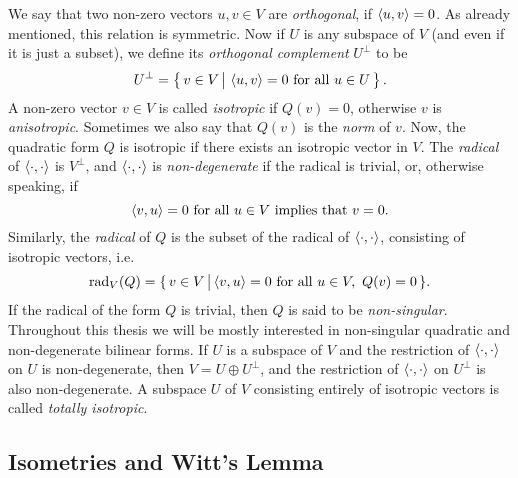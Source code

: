 We say that two non-zero vectors $u,v \in V$ are \textit{orthogonal}, if $\langle u, v \rangle = 0$. As
already mentioned, this relation is symmetric. Now if $U$ is any subspace of $V$ (and even if 
it is just a subset), we define its \textit{orthogonal complement} $U^{\perp}$ to be
\begin{equation}
	U^{\perp} = \left\{\, v \in V\, \big|\ \langle u, v \rangle = 0\ \mbox{for all}\  u \in U\,\right\}.
\end{equation}
A non-zero vector $v\in V$ is called \textit{isotropic} if $Q(v) = 0$, otherwise
$v$ is \textit{anisotropic}. Sometimes we also say that $Q(v)$ is the \textit{norm} of
$v$. Now, the quadratic form $Q$ is isotropic if there exists an isotropic vector in $V$. 
The \textit{radical} of $\langle \cdot, \cdot \rangle$ is $V^{\perp}$, and $\langle \cdot, \cdot \rangle$ is 
\textit{non-degenerate} if the radical is trivial, or, otherwise speaking, if
\begin{equation}
	\langle v, u \rangle = 0\ \mbox{for all}\ u \in V \mbox{ implies that } v = 0.
\end{equation}
Similarly, the \textit{radical} of $Q$ is 
the subset of the radical of $\langle \cdot, \cdot \rangle$, consisting of isotropic vectors, i.e.
\begin{equation}
	\label{eq:quadratic_form_radical}
	\mathrm{rad}_V(Q) = \{\, v \in V\, \big|\, \inner{v}{u} = 0\ \mbox{for all}\ u \in V,\ 
		Q(v) = 0\,\}.
\end{equation}
If the radical of the form $Q$ is trivial, then $Q$ is said to be
\textit{non-singular}. Throughout this thesis we will be mostly 
interested in non-singular quadratic and non-degenerate bilinear forms.
If $U$ is a subspace of $V$ and the restriction of $\langle \cdot, \cdot \rangle$ on $U$ 
is non-degenerate, then $V = U \oplus U^{\perp}$, and the restriction of $\langle \cdot, \cdot \rangle$
on $U^{\perp}$ is also non-degenerate. A subspace $U$ of $V$ consisting entirely of isotropic vectors is called \textit{totally isotropic}.

\subsection{Isometries and Witt's Lemma}

